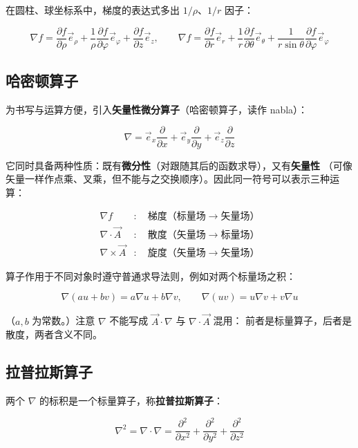 在圆柱、球坐标系中，梯度的表达式多出 $1/\rho$、$1/r$ 因子：
\begin{formulaBox}
\[
\nabla f=\frac{\partial f}{\partial\rho}\vec{e}_\rho+\frac{1}{\rho}\frac{\partial f}{\partial\varphi}\vec{e}_\varphi+\frac{\partial f}{\partial z}\vec{e}_z,
\qquad
\nabla f=\frac{\partial f}{\partial r}\vec{e}_r+\frac{1}{r}\frac{\partial f}{\partial\theta}\vec{e}_\theta+\frac{1}{r\sin\theta}\frac{\partial f}{\partial\varphi}\vec{e}_\varphi
\]
\end{formulaBox}

\subsection{哈密顿算子}

为书写与运算方便，引入\textbf{矢量性微分算子}（哈密顿算子，读作 nabla）：
\begin{formulaBox}
\[
\nabla=\vec{e}_x\frac{\partial}{\partial x}+\vec{e}_y\frac{\partial}{\partial y}+\vec{e}_z\frac{\partial}{\partial z}
\]
\end{formulaBox}

它同时具备两种性质：既有\textbf{微分性}（对跟随其后的函数求导），又有\textbf{矢量性}
（可像矢量一样作点乘、叉乘，但不能与之交换顺序）。因此同一符号可以表示三种运算：
\begin{formulaBox}
\[
\begin{aligned}
\nabla f&:\quad \text{梯度（标量场}\to\text{矢量场）}\\
\nabla\cdot\vec{A}&:\quad \text{散度（矢量场}\to\text{标量场）}\\
\nabla\times\vec{A}&:\quad \text{旋度（矢量场}\to\text{矢量场）}
\end{aligned}
\]
\end{formulaBox}

算子作用于不同对象时遵守普通求导法则，例如对两个标量场之积：
\begin{formulaBox}
\[
\nabla(au+bv)=a\nabla u+b\nabla v,\qquad \nabla(uv)=u\nabla v+v\nabla u
\]
\end{formulaBox}

（$a,b$ 为常数。）注意 $\nabla$ 不能写成 $\vec{A}\cdot\nabla$ 与 $\nabla\cdot\vec{A}$ 混用：
前者是标量算子，后者是散度，两者含义不同。

\subsection{拉普拉斯算子}

两个 $\nabla$ 的标积是一个标量算子，称\textbf{拉普拉斯算子}：
\begin{formulaBox}
\[
\nabla^2=\nabla\cdot\nabla=\frac{\partial^2}{\partial x^2}+\frac{\partial^2}{\partial y^2}+\frac{\partial^2}{\partial z^2}
\]
\end{formulaBox}

